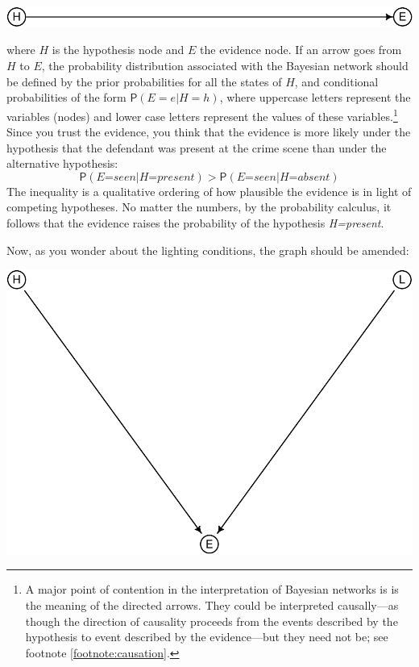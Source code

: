 \documentclass[
  11pt,
  dvipsnames,enabledeprecatedfontcommands]{scrartcl}
\newcommand{\pr}[1]{\ensuremath{\mathsf{P}(#1)}}
\begin{document}
\begin{center}\includegraphics[width=0.5\linewidth,height=0.5\textheight]{ReplyToSteeleStefansson5_files/figure-latex/heDAG-1} \end{center}

\noindent where \(H\) is the hypothesis node and \(E\) the evidence
node. If an arrow goes from \(H\) to \(E\), the probability distribution
associated with the Bayesian network should be defined by the prior
probabilities for all the states of \(H\), and conditional probabilities
of the form \(\pr{E=e \vert H=h}\), where uppercase letters represent
the variables (nodes) and lower case letters represent the values of
these variables.\footnote{A major point of contention in the
  interpretation of Bayesian networks is is the meaning of the directed
  arrows. They could be interpreted causally---as though the direction
  of causality proceeds from the events described by the hypothesis to
  event described by the evidence---but they need not be; see footnote
  \ref{footnote:causation}.} Since you trust the evidence, you think
that the evidence is more likely under the hypothesis that the defendant
was present at the crime scene than under the alternative hypothesis:
\[\pr{\textit{E=seen} \vert \textit{H=present}} > \pr{\textit{E=seen} \vert \textit{H=absent}}\]
The inequality is a qualitative ordering of how plausible the evidence
is in light of competing hypotheses. No matter the numbers, by the
probability calculus, it follows that the evidence raises the
probability of the hypothesis \textit{H=present}.

Now, as you wonder about the lighting conditions, the graph should be
amended:

\begin{center}\includegraphics[width=0.5\linewidth,height=0.3\textheight]{ReplyToSteeleStefansson5_files/figure-latex/lighting2DAG-1} \end{center}
\end{document}
